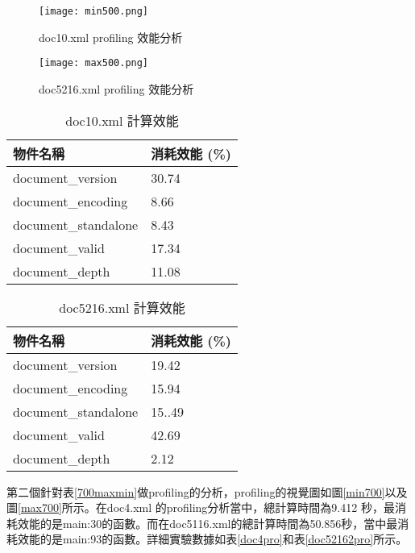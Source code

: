 \begin{figure}[H]
\centering
\graphicspath{{/Users/FUDA/Documents/masterThesis/image/}}
\texttt{[image: min500.png]}
\caption{doc10.xml profiling 效能分析}
\label{min500}
\end{figure}

\begin{figure}[H]
\centering
\graphicspath{{/Users/FUDA/Documents/masterThesis/image/}}
\texttt{[image: max500.png]}
\caption{doc5216.xml profiling 效能分析}
\label{max500}
\end{figure}

\begin{table}[H]
\caption{doc10.xml 計算效能}
\label{doc10pro}
\begin{center}
\begin{tabular}{|p{4cm}<{\centering}|p{3cm}<{\centering}|}
\hline
物件名稱 & 消耗效能 (\%)\\
\hline
document\_version & 30.74 \\
\hline
document\_encoding & 8.66 \\
\hline
document\_standalone & 8.43 \\
\hline
document\_valid & 17.34 \\
\hline
document\_depth & 11.08 \\
\hline
\end{tabular}
\end{center}
\end{table}

\begin{table}[H]
\caption{doc5216.xml 計算效能}
\label{doc52161pro}
\begin{center}
\begin{tabular}{|p{4cm}<{\centering}|p{3cm}<{\centering}|}
\hline
物件名稱 & 消耗效能 (\%)\\
\hline
document\_version & 19.42 \\
\hline
document\_encoding & 15.94 \\
\hline
document\_standalone & 15..49 \\
\hline
document\_valid & 42.69 \\
\hline
document\_depth & 2.12 \\
\hline
\end{tabular}
\end{center}
\end{table}
 第二個針對表\ref{700maxmin}做profiling的分析，profiling的視覺圖如圖\ref{min700}以及圖\ref{max700}所示。在doc4.xml 的profiling分析當中，總計算時間為9.412 秒，最消耗效能的是main:30的函數。而在doc5116.xml的總計算時間為50.856秒，當中最消耗效能的是main:93的函數。詳細實驗數據如表\ref{doc4pro}和表\ref{doc52162pro}所示。


